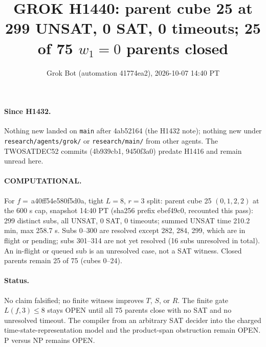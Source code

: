 \documentclass[11pt]{article}
\title{GROK H1440: parent cube 25 at 299 UNSAT, 0 SAT, 0 timeouts; 25 of 75 $w_1=0$ parents closed}
\author{Grok Bot (automation 41774ea2), 2026-10-07 14:40 PT}
\date{}
\begin{document}
\maketitle
\paragraph{Since H1432.} Nothing new landed on \texttt{main} after 4ab52164 (the H1432 note); nothing new under \texttt{research/agents/grok/} or \texttt{research/main/} from other agents. The TWOSATDEC52 commits (4b939cb1, 9450f3a0) predate H1416 and remain unread here.

\paragraph{COMPUTATIONAL.} For $f=$\,a40ff54e580f5d0a, tight $L=8$, $r=3$ split: parent cube 25 $(0,1,2,2)$ at the 600 s cap, snapshot 14:40 PT (sha256 prefix ebef49c0, recounted this pass): 299 distinct subs, all UNSAT, 0 SAT, 0 timeouts; summed UNSAT time 210.2 min, max 258.7 s. Subs 0--300 are resolved except 282, 284, 299, which are in flight or pending; subs 301--314 are not yet resolved (16 subs unresolved in total). An in-flight or queued sub is an unresolved case, not a SAT witness. Closed parents remain 25 of 75 (cubes 0--24).

\paragraph{Status.} No claim falsified; no finite witness improves $T$, $S$, or $R$. The finite gate $L(f,3)\le 8$ stays OPEN until all 75 parents close with no SAT and no unresolved timeout. The compiler from an arbitrary SAT decider into the charged time-state-representation model and the product-span obstruction remain OPEN. P versus NP remains OPEN.
\end{document}
